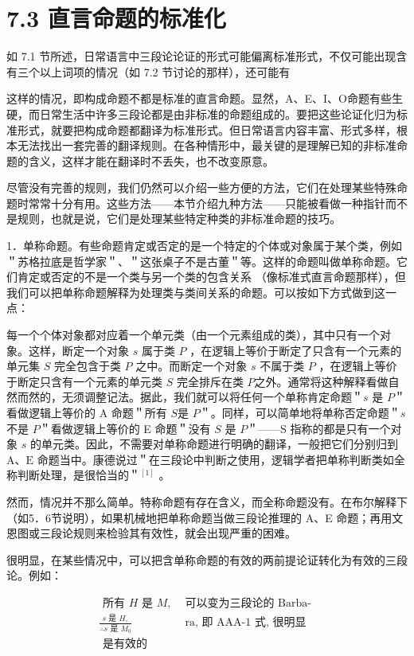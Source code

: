 \section*{7.3 直言命题的标准化}
如 7.1 节所述，日常语言中三段论论证的形式可能偏离标准形式，不仅可能出现含有三个以上词项的情况（如 7.2 节讨论的那样），还可能有

这样的情况，即构成命题不都是标准的直言命题。显然，A、E、I、O命题有些生硬，而日常生活中许多三段论都是由非标准的命题组成的。要把这些论证化归为标准形式，就要把构成命题都翻译为标准形式。但日常语言内容丰富、形式多样，根本无法找出一套完善的翻译规则。在各种情形中，最关键的是理解已知的非标准命题的含义，这样才能在翻译时不丢失，也不改变原意。

尽管没有完善的规则，我们仍然可以介绍一些方便的方法，它们在处理某些特殊命题时常常十分有用。这些方法——本节介绍九种方法——只能被看做一种指针而不是规则，也就是说，它们是处理某些特定种类的非标准命题的技巧。

1．单称命题。有些命题肯定或否定的是一个特定的个体或对象属于某个类，例如＂苏格拉底是哲学家＂、＂这张桌子不是古董＂等。这样的命题叫做单称命题。它们肯定或否定的不是一个类与另一个类的包含关系 （像标准式直言命题那样），但我们可以把单称命题解释为处理类与类间关系的命题。可以按如下方式做到这一点：

每一个个体对象都对应着一个单元类（由一个元素组成的类），其中只有一个对象。这样，断定一个对象 $s$ 属于类 $P$ ，在逻辑上等价于断定了只含有一个元素的单元集 $S$ 完全包含于类 $P$ 之中。而断定一个对象 $s$ 不属于类 $P$ ，在逻辑上等价于断定只含有一个元素的单元类 $S$ 完全排斥在类 $P$之外。通常将这种解释看做自然而然的，无须调整记法。据此，我们就可以将任何一个单称肯定命题＂$s$ 是 $P$＂看做逻辑上等价的 A 命题＂所有 $S$是 $P$＂。同样，可以简单地将单称否定命题＂$s$ 不是 $P$＂看做逻辑上等价的 E 命题＂没有 $S$ 是 $P$＂——S 指称的都是只有一个对象 $s$ 的单元类。因此，不需要对单称命题进行明确的翻译，一般把它们分别归到 $\mathrm{A} 、 \mathrm{E}$ 命题当中。康德说过＂在三段论中判断之使用，逻辑学者把单称判断类如全称判断处理，是很恰当的＂${ }^{[1]}$ 。

然而，情况并不那么简单。特称命题有存在含义，而全称命题没有。在布尔解释下（如5．6节说明），如果机械地把单称命题当做三段论推理的 A、E 命题；再用文恩图或三段论规则来检验其有效性，就会出现严重的困难。

很明显，在某些情况中，可以把含单称命题的有效的两前提论证转化为有效的三段论。例如：

$$
\begin{array}{ll}
\text { 所有 } H \text { 是 } M, & \text { 可以变为三段论的 Barba- } \\
\frac{s \text { 是 } H,}{\therefore s \text { 是 } M_{0}} & \text { ra, 即 AAA-1 式, 很明显 } \\
\text { 是有效的 } &
\end{array}
$$


